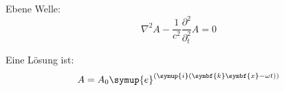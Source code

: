 Ebene Welle:
\begin{equation}
  \nabla^2 A - \frac{1}{c^2} \frac{\partial^2}{\partial_{t}^2} A =0
\end{equation}

Eine Lösung ist:
\begin{equation}
  A = A_{0} \symup{e}^ {\left (\symup{i} \left (\symbf{k} \symbf{x} - \omega t
  \right) \right)}
\end{equation}
